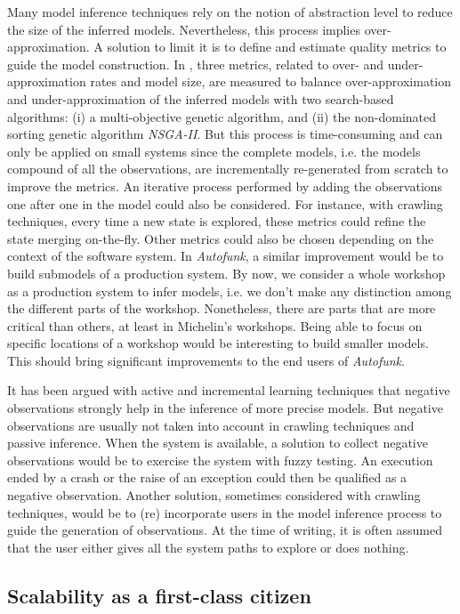 Many model inference techniques rely on the notion of abstraction
level to reduce the size of the inferred models. Nevertheless,
this process implies over-approximation. A solution to limit it
is to define and estimate quality metrics
\cite{tonella2012finding,Lo20122063} to guide the model
construction. In \cite{tonella2012finding}, three metrics,
related to over- and under-approximation rates and model size,
are measured to balance over-approximation and
under-approximation of the inferred models with two search-based
algorithms: (i) a multi-objective genetic algorithm, and (ii) the
non-dominated sorting genetic algorithm \textit{NSGA-II}. But
this process is time-consuming and can only be applied on small
systems since the complete models, i.e. the models compound of
all the observations, are incrementally re-generated from scratch
to improve the metrics.  An iterative process performed by adding
the observations one after one in the model could also be
considered. For instance, with crawling techniques, every time a
new state is explored, these metrics could refine the state
merging on-the-fly. Other metrics could also be chosen depending
on the context of the software system. In \textit{Autofunk}, a
similar improvement would be to build submodels of a production
system. By now, we consider a whole workshop as a production
system to infer models, i.e. we don't make any distinction among
the different parts of the workshop. Nonetheless, there are parts
that are more critical than others, at least in Michelin's
workshops. Being able to focus on specific locations of a
workshop would be interesting to build smaller models. This
should bring significant improvements to the end users of
\textit{Autofunk}.

It has been argued with active and incremental learning
techniques that negative observations strongly help in the
inference of more precise models. But negative observations are
usually not taken into account in crawling techniques and passive
inference. When the system is available, a solution to collect
negative observations would be to exercise the system with fuzzy
testing. An execution ended by a crash or the raise of an
exception could then be qualified as a negative observation.
Another solution, sometimes considered with crawling techniques,
would be to (re) incorporate users in the model inference process
to guide the generation of observations. At the time of writing,
it is often assumed that the user either gives all the system
paths to explore or does nothing.

\subsection{Scalability as a first-class citizen}

